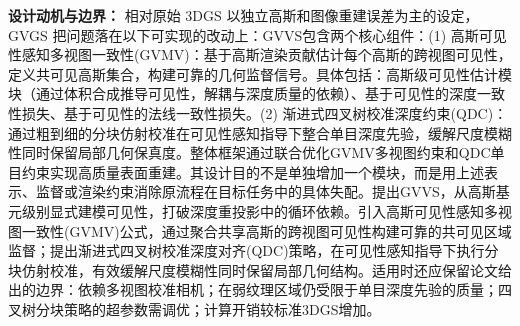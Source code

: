 \textbf{设计动机与边界：} 相对原始 3DGS 以独立高斯和图像重建误差为主的设定，GVGS 把问题落在以下可实现的改动上：GVVS包含两个核心组件：(1) 高斯可见性感知多视图一致性(GVMV)：基于高斯渲染贡献估计每个高斯的跨视图可见性，定义共可见高斯集合，构建可靠的几何监督信号。具体包括：高斯级可见性估计模块（通过体积合成推导可见性，解耦与深度质量的依赖）、基于可见性的深度一致性损失、基于可见性的法线一致性损失。(2) 渐进式四叉树校准深度约束(QDC)：通过粗到细的分块仿射校准在可见性感知指导下整合单目深度先验，缓解尺度模糊性同时保留局部几何保真度。整体框架通过联合优化GVMV多视图约束和QDC单目约束实现高质量表面重建。其设计目的不是单独增加一个模块，而是用上述表示、监督或渲染约束消除原流程在目标任务中的具体失配。提出GVVS，从高斯基元级别显式建模可见性，打破深度重投影中的循环依赖。引入高斯可见性感知多视图一致性(GVMV)公式，通过聚合共享高斯的跨视图可见性构建可靠的共可见区域监督；提出渐进式四叉树校准深度对齐(QDC)策略，在可见性感知指导下执行分块仿射校准，有效缓解尺度模糊性同时保留局部几何结构。适用时还应保留论文给出的边界：依赖多视图校准相机；在弱纹理区域仍受限于单目深度先验的质量；四叉树分块策略的超参数需调优；计算开销较标准3DGS增加。
